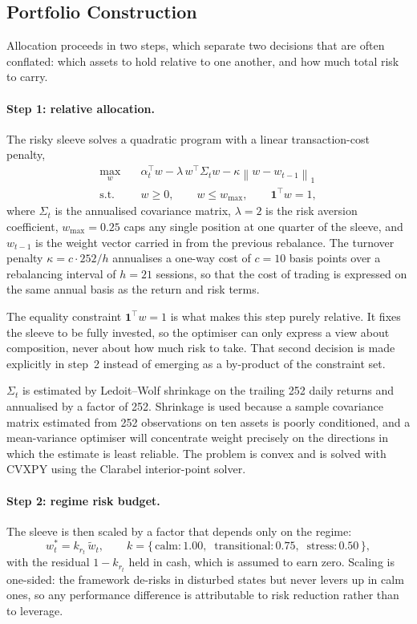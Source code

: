 \documentclass{singlecol-new}
\theoremstyle{TH}{
\newtheorem{lemma}{Lemma}
\newtheorem{theorem}[lemma]{Theorem}
\newtheorem{corrolary}[lemma]{Corrolary}
\newtheorem{conjecture}[lemma]{Conjecture}
\newtheorem{proposition}[lemma]{Proposition}
\newtheorem{claim}[lemma]{Claim}
\newtheorem{stheorem}[lemma]{Wrong Theorem}
\newtheorem{algorithm}{Algorithm}
}
\theoremstyle{THrm}{
\newtheorem{definition}{Definition}[section]
\newtheorem{question}{Question}[section]
\newtheorem{remark}{Remark}
\newtheorem{scheme}{Scheme}
}
\theoremstyle{THhit}{
\newtheorem{case}{Case}[section]
}
\begin{document}
\subsection{Portfolio Construction}

Allocation proceeds in two steps, which separate two decisions that are often conflated:
which assets to hold relative to one another, and how much total risk to carry.

\paragraph{Step 1: relative allocation.} The risky sleeve solves a quadratic program
with a linear transaction-cost penalty,
\begin{align}
\max_{w} \quad & \alpha_t^{\top} w - \lambda \, w^{\top} \Sigma_t w
- \kappa \left\| w - w_{t-1} \right\|_1 \\
\text{s.t.} \quad & w \geq 0, \qquad w \leq w_{\max}, \qquad \mathbf{1}^{\top} w = 1,
\end{align}
where $\Sigma_t$ is the annualised covariance matrix, $\lambda = 2$ is the risk
aversion coefficient, $w_{\max} = 0.25$ caps any single position at one quarter of the
sleeve, and $w_{t-1}$ is the weight vector carried in from the previous rebalance. The
turnover penalty $\kappa = c \cdot 252 / h$ annualises a one-way cost of $c = 10$ basis
points over a rebalancing interval of $h = 21$ sessions, so that the cost of trading is
expressed on the same annual basis as the return and risk terms.

The equality constraint $\mathbf{1}^{\top} w = 1$ is what makes this step purely
relative. It fixes the sleeve to be fully invested, so the optimiser can only express a
view about composition, never about how much risk to take. That second decision is made
explicitly in step~2 instead of emerging as a by-product of the constraint set.

$\Sigma_t$ is estimated by Ledoit--Wolf shrinkage \citep{ledoit04} on the trailing 252
daily returns and annualised by a factor of 252. Shrinkage is used because a sample
covariance matrix estimated from 252 observations on ten assets is poorly conditioned,
and a mean-variance optimiser will concentrate weight precisely on the directions in
which the estimate is least reliable. The problem is convex and is solved with CVXPY
using the Clarabel interior-point solver.

\paragraph{Step 2: regime risk budget.} The sleeve is then scaled by a factor that
depends only on the regime:
\begin{equation}
w^{\ast}_t = k_{r_t} \, \tilde{w}_t, \qquad
k = \{\,\text{calm}: 1.00, \;\; \text{transitional}: 0.75, \;\; \text{stress}: 0.50\,\},
\label{eq:budget}
\end{equation}
with the residual $1 - k_{r_t}$ held in cash, which is assumed to earn zero. Scaling is
one-sided: the framework de-risks in disturbed states but never levers up in calm ones,
so any performance difference is attributable to risk reduction rather than to leverage.
\end{document}
